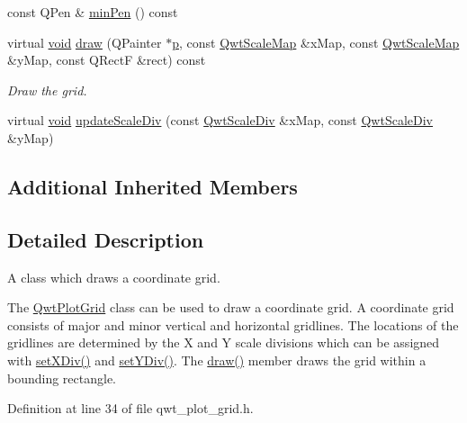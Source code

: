 \begin{DoxyCompactItemize}
\item 
const Q\-Pen \& \hyperlink{class_qwt_plot_grid_adbbaea0c1ba977aa40403f8ca6b13d8d}{min\-Pen} () const 
\item 
virtual \hyperlink{group___u_a_v_objects_plugin_ga444cf2ff3f0ecbe028adce838d373f5c}{void} \hyperlink{class_qwt_plot_grid_a9534a18db4f70b798bbbee2e50e0458d}{draw} (Q\-Painter $\ast$\hyperlink{glext_8h_aa5367c14d90f462230c2611b81b41d23}{p}, const \hyperlink{class_qwt_scale_map}{Qwt\-Scale\-Map} \&x\-Map, const \hyperlink{class_qwt_scale_map}{Qwt\-Scale\-Map} \&y\-Map, const Q\-Rect\-F \&rect) const 
\begin{DoxyCompactList}\small\item\em Draw the grid. \end{DoxyCompactList}\item 
virtual \hyperlink{group___u_a_v_objects_plugin_ga444cf2ff3f0ecbe028adce838d373f5c}{void} \hyperlink{class_qwt_plot_grid_ad15166f257160adc90b60b9e29d69edf}{update\-Scale\-Div} (const \hyperlink{class_qwt_scale_div}{Qwt\-Scale\-Div} \&x\-Map, const \hyperlink{class_qwt_scale_div}{Qwt\-Scale\-Div} \&y\-Map)
\end{DoxyCompactItemize}
\subsection*{Additional Inherited Members}


\subsection{Detailed Description}
A class which draws a coordinate grid. 

The \hyperlink{class_qwt_plot_grid}{Qwt\-Plot\-Grid} class can be used to draw a coordinate grid. A coordinate grid consists of major and minor vertical and horizontal gridlines. The locations of the gridlines are determined by the X and Y scale divisions which can be assigned with \hyperlink{class_qwt_plot_grid_aeeb88397c2aaf5e763d57c898a2fcd13}{set\-X\-Div()} and \hyperlink{class_qwt_plot_grid_a9eb130275560bdaa65551e2f69232b72}{set\-Y\-Div()}. The \hyperlink{class_qwt_plot_grid_a9534a18db4f70b798bbbee2e50e0458d}{draw()} member draws the grid within a bounding rectangle. 

Definition at line 34 of file qwt\-\_\-plot\-\_\-grid.\-h.



